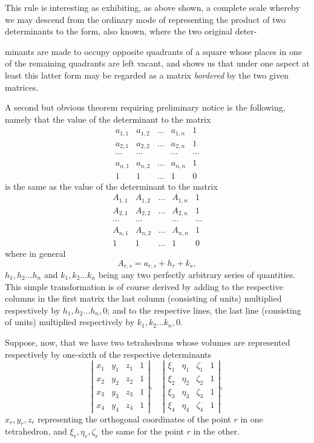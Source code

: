 \documentclass[11pt]{article}
\newcommand{\sourcepage}[1]{\marginpar{\scriptsize p.~#1}}
\begin{document}
{{This rule is interesting as exhibiting, as above shown, a complete scale whereby we may descend from the ordinary mode of representing the product of two determinants to the form, also known, where the two original deter-

\sourcepage{385}
minants are made to occupy opposite quadrants of a square whose places in one of the remaining quadrants are left vacant, and shows us that under one aspect at least this latter form may be regarded as a matrix \emph{bordered} by the two given matrices.

A second but obvious theorem requiring preliminary notice is the following, namely that the value of the determinant to the matrix
\[
\begin{array}{ccccc}
a_{1,1}&a_{1,2}&\ldots&a_{1,n}&1\\
a_{2,1}&a_{2,2}&\ldots&a_{2,n}&1\\
\cdots&\cdots&&\cdots&\cdots\\
a_{n,1}&a_{n,2}&\ldots&a_{n,n}&1\\
1&1&\ldots&1&0
\end{array}
\]
is the same as the value of the determinant to the matrix
\[
\begin{array}{ccccc}
A_{1,1}&A_{1,2}&\ldots&A_{1,n}&1\\
A_{2,1}&A_{2,2}&\ldots&A_{2,n}&1\\
\cdots&\cdots&&\cdots&\cdots\\
A_{n,1}&A_{n,2}&\ldots&A_{n,n}&1\\
1&1&\ldots&1&0
\end{array}
\]
where in general
\[
A_{r,s}=a_{r,s}+h_r+k_s,
\]
$h_1,h_2\ldots h_n$ and $k_1,k_2\ldots k_n$ being any two perfectly arbitrary series of quantities. This simple transformation is of course derived by adding to the respective columns in the first matrix the last column (consisting of units) multiplied respectively by $h_1,h_2\ldots h_n,0$; and to the respective lines, the last line (consisting of units) multiplied respectively by $k_1,k_2\ldots k_n,0$.

Suppose, now, that we have two tetrahedrons whose volumes are represented respectively by one-sixth of the respective determinants
\[
\left|\begin{array}{cccc}
x_1&y_1&z_1&1\\
x_2&y_2&z_2&1\\
x_3&y_3&z_3&1\\
x_4&y_4&z_4&1
\end{array}\right|,
\quad
\left|\begin{array}{cccc}
\xi_1&\eta_1&\zeta_1&1\\
\xi_2&\eta_2&\zeta_2&1\\
\xi_3&\eta_3&\zeta_3&1\\
\xi_4&\eta_4&\zeta_4&1
\end{array}\right|,
\]
$x_r,y_r,z_r$ representing the orthogonal coordinates of the point $r$ in one tetrahedron, and $\xi_r,\eta_r,\zeta_r$ the same for the point $r$ in the other.

}}
\end{document}
